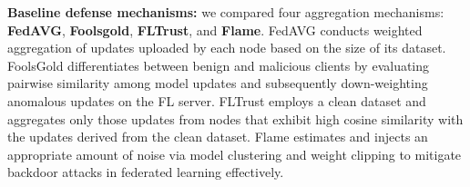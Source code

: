 \documentclass[lettersize,journal]{IEEEtran}
\begin{document}
\textbf{Baseline defense mechanisms:} 
we compared four aggregation mechanisms: \textbf{FedAVG}\cite{FedAVG}, \textbf{Foolsgold}\cite{foolsgold}, \textbf{FLTrust}\cite{FLTrust}, and \textbf{Flame}\cite{FLAME}. FedAVG conducts weighted aggregation of updates uploaded by each node based on the size of its dataset. FoolsGold differentiates between benign and malicious clients by evaluating pairwise similarity among model updates and subsequently down-weighting anomalous updates on the FL server. FLTrust employs a clean dataset and aggregates only those updates from nodes that exhibit high cosine similarity with the updates derived from the clean dataset. Flame estimates and injects an appropriate amount of noise via model clustering and weight clipping to mitigate backdoor attacks in federated learning effectively.
    
\end{document}
